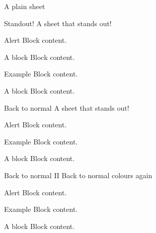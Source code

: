 \documentclass[12pt, dutch]{beamer}
\begin{document}
\begin{frame}[plain]
  A plain sheet
\end{frame}
 
\begin{frame}[standout]{Standout!}
  A sheet that stands out!
  \begin{alertblock}{Alert}
        Block content.
      \end{alertblock}
         \begin{block}{A block}
        Block content.
       \end{block} 
      \begin{exampleblock}{Example}
        Block content.
       \end{exampleblock} 
      \begin{block}{A block}
        Block content.
       \end{block}        
\end{frame} 

\begin{frame}{Back to normal}
  A sheet that stands out!
  \begin{alertblock}{Alert}
        Block content.
      \end{alertblock}
      \begin{exampleblock}{Example}
        Block content.
       \end{exampleblock} 
      \begin{block}{A block}
        Block content.
       \end{block}        
\end{frame} 
 
\begin{frame}{Back to normal II}
  Back to normal colours again
  \begin{alertblock}{Alert}
        Block content.
      \end{alertblock}
      \begin{exampleblock}{Example}
        Block content.
       \end{exampleblock} 
      \begin{block}{A block}
        Block content.
       \end{block}        
\end{frame} 

\end{document}

